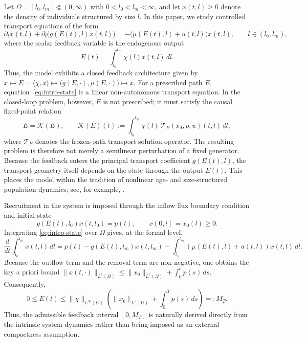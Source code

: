 \documentclass[pdflatex,sn-mathphys-num]{sn-jnl}
\theoremstyle{thmstyleone}
\theoremstyle{definition}
\theoremstyle{remark}
\numberwithin{equation}{section}
\begin{document}
Let $\Omega=[l_0,l_m]\Subset(0,\infty)$ with $0<l_0<l_m<\infty$, and let $x(t,l)\ge0$ denote the density of individuals structured by size $l$. In this paper, we study controlled transport equations of the form
\begin{equation}
\label{eq:intro-state}
\partial_t x(t,l)
+
\partial_l\!\big(g(E(t),l)x(t,l)\big)
=
-\big(\mu(E(t),l)+u(t,l)\big)x(t,l),
\qquad l\in(l_0,l_m),
\end{equation}
where the scalar feedback variable is the endogenous output
\begin{equation}
\label{eq:intro-output}
E(t)=\int_{l_0}^{l_m}\chi(l)x(t,l)\,dl .
\end{equation}
Thus, the model exhibits a closed feedback architecture given by $x \longmapsto E=\langle\chi,x\rangle \longmapsto \big(g(E,\cdot),\mu(E,\cdot)\big) \longmapsto x$. For a prescribed path $E$, equation~\eqref{eq:intro-state} is a linear non-autonomous transport equation. In the closed-loop problem, however, $E$ is not prescribed; it must satisfy the causal fixed-point relation
\begin{equation}
\label{eq:intro-fixed-point}
E=\mathcal K(E),
\qquad
\mathcal K(E)(t)
:=
\int_{l_0}^{l_m}
\chi(l)\,\mathcal T_E(x_0,p,u)(t,l)\,dl ,
\end{equation}
where $\mathcal T_E$ denotes the frozen-path transport solution operator. The resulting problem is therefore not merely a semilinear perturbation of a fixed generator. Because the feedback enters the principal transport coefficient $g(E(t),l)$, the transport geometry itself depends on the state through the output $E(t)$. This places the model within the tradition of nonlinear age- and size-structured population dynamics; see, for example, \cite{diekmann1998formulation,gurtin1974non,iannelli1995mathematical,metz2014dynamics,perthame2007transport,thieme2018mathematics,webb1985theory,liu2026ftu}.

Recruitment in the system is imposed through the inflow flux boundary condition and initial state
\begin{equation}
\label{eq:intro-flux-bc}
g(E(t),l_0)x(t,l_0)=p(t),
\qquad
x(0,l)=x_0(l)\ge0 .
\end{equation}
Integrating \eqref{eq:intro-state} over $\Omega$ gives, at the formal level,
\[
\frac{d}{dt}\int_{l_0}^{l_m}x(t,l)\,dl
=
p(t)
-
g(E(t),l_m)x(t,l_m)
-
\int_{l_0}^{l_m}
(\mu(E(t),l)+u(t,l))x(t,l)\,dl .
\]
Because the outflow term and the removal term are non-negative, one obtains the key a priori bound $\|x(t,\cdot)\|_{L^1(\Omega)} \le \|x_0\|_{L^1(\Omega)} + \int_0^t p(s)\,ds$. Consequently,
\begin{equation}
\label{eq:intro-MT}
0\le E(t)\le
\|\chi\|_{L^\infty(\Omega)}
\left(
\|x_0\|_{L^1(\Omega)}
+
\int_0^T p(s)\,ds
\right)
=:M_T .
\end{equation}
Thus, the admissible feedback interval $[0,M_T]$ is naturally derived directly from the intrinsic system dynamics rather than being imposed as an external compactness assumption.
\end{document}
